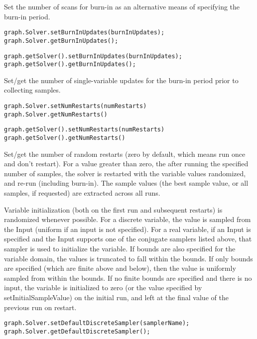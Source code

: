 Set the number of scans for burn-in as an alternative means of specifying the burn-in period.

\ifmatlab
\begin{lstlisting}
graph.Solver.setBurnInUpdates(burnInUpdates);
graph.Solver.getBurnInUpdates();
\end{lstlisting}
\fi

\ifjava
\begin{lstlisting}
graph.getSolver().setBurnInUpdates(burnInUpdates);
graph.getSolver().getBurnInUpdates();
\end{lstlisting}
\fi

Set/get the number of single-variable updates for the burn-in period prior to collecting samples.

\ifmatlab
\begin{lstlisting}
graph.Solver.setNumRestarts(numRestarts)
graph.Solver.getNumRestarts() 
\end{lstlisting}
\fi

\ifjava
\begin{lstlisting}
graph.getSolver().setNumRestarts(numRestarts)
graph.getSolver().getNumRestarts() 
\end{lstlisting}
\fi

Set/get the number of random restarts (zero by default, which means run once and don't restart).  For a value greater than zero, the after running the specified number of samples, the solver is restarted with the variable values randomized, and re-run (including burn-in).  The sample values (the best sample value, or all samples, if requested) are extracted across all runs.

Variable initialization (both on the first run and subsequent restarts) is randomized whenever possible.  For a discrete variable, the value is sampled from the Input (uniform if an input is not specified).  For a real variable, if an Input is specified and the Input supports one of the conjugate samplers listed above, that sampler is used to initialize the variable.  If bounds are also specified for the variable domain, the values is truncated to fall within the bounds.  If only bounds are specified (which are finite above and below), then the value is uniformly sampled from within the bounds.  If no finite bounds are specified and there is no input, the variable is initialized to zero (or the value specified by setInitialSampleValue) on the initial run, and left at the final value of the previous run on restart.


\ifmatlab
\begin{lstlisting}
graph.Solver.setDefaultDiscreteSampler(samplerName);
graph.Solver.getDefaultDiscreteSampler();
\end{lstlisting}
\fi


